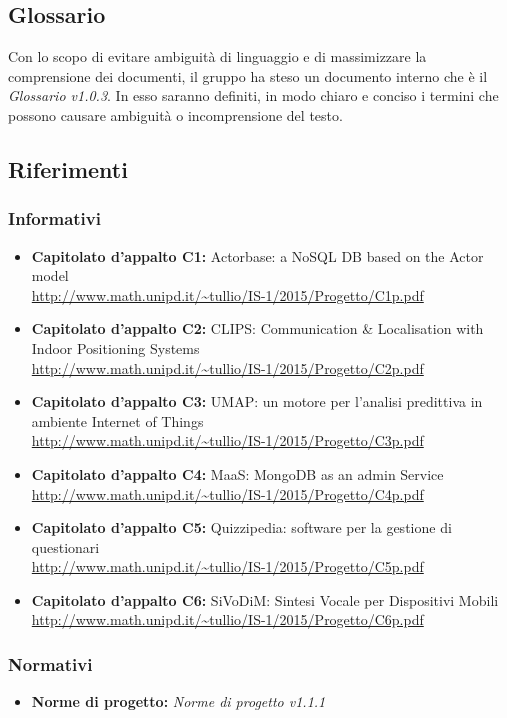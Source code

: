 \documentclass[a4paper]{article}
\begin{document}
	\subsection{Glossario}
		Con lo scopo di evitare ambiguità di linguaggio e di massimizzare la comprensione dei documenti, il 
      gruppo ha steso un documento interno che è il \emph{Glossario v1.0.3}. In esso saranno definiti, in modo
      chiaro e conciso i termini che possono causare ambiguità o incomprensione del testo.
	\subsection{Riferimenti}
	\subsubsection{Informativi}	
		\begin{itemize}
			\item \textbf{Capitolato d'appalto C1:} Actorbase: a NoSQL DB based on the Actor model \\
			\url{http://www.math.unipd.it/~tullio/IS-1/2015/Progetto/C1p.pdf}
			\item \textbf{Capitolato d'appalto C2:} CLIPS: Communication \& Localisation with Indoor
			 Positioning Systems \\
			\url{http://www.math.unipd.it/~tullio/IS-1/2015/Progetto/C2p.pdf}
			\item \textbf{Capitolato d'appalto C3:} UMAP: un motore per l'analisi predittiva in ambiente
			 Internet of Things \\
			\url{http://www.math.unipd.it/~tullio/IS-1/2015/Progetto/C3p.pdf}
			\item \textbf{Capitolato d'appalto C4:} MaaS: MongoDB as an admin Service \\
			\url{http://www.math.unipd.it/~tullio/IS-1/2015/Progetto/C4p.pdf}
			\item \textbf{Capitolato d'appalto C5:} Quizzipedia: software per la gestione di questionari \\
			\url{http://www.math.unipd.it/~tullio/IS-1/2015/Progetto/C5p.pdf}
			\item \textbf{Capitolato d'appalto C6:} SiVoDiM: Sintesi Vocale per Dispositivi Mobili \\
			\url{http://www.math.unipd.it/~tullio/IS-1/2015/Progetto/C6p.pdf}
		\end{itemize}
	\subsubsection{Normativi}
		\begin{itemize}
			\item \textbf{Norme di progetto:} \emph{Norme di progetto v1.1.1}
		\end{itemize}
\end{document}
